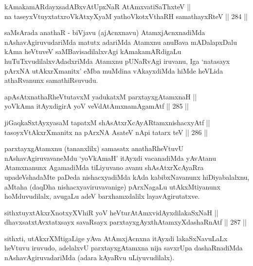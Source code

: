 \begin{shl}
kAmakamARdayxsadABxvAtUpxNaR AtAmx\s vatiSaThxteV ||  \\
na taseyxVtuyxtatxroVkAtxyX\s yaM yathoVkotxV\s thaRH samathayxRteV \hfill || 284 ||  
\end{shl}

\begin{artha}
saMsArada anathaR - biVjavu (ajAcnxnavu) AtamxjAcnxnadiMda
nAshavAgiruvudariMda matutx adariMda Atamxnu anuBava mADalapxDalu kAma
heVtuveV saMBavisadilalxvAgi kAmakamARdigaLu huTuTxvudilalxvAdadxriMda
Atamxnu pUNaRvAgi iruvanu, Iga `natasayx pArxNA utAkxrXmanitx' eMba
muMdina vAkayxdiMda hiMde heVLida athaRvanunx samathiRsuvudu.
\end{artha}

\begin{shl}
apAsAtxnathaRheVtutavxM yadukatxM parxtayxgAtamxnaH || \\
yoV\s kAma itAyxdigirA yoV veVdA\s \s tAmxnamAgamAtf \hfill || 285 ||  
\end{shl}

\begin{shl}
jiGaqkaSxtAyxyasaM tapatxM shAsAtxrXcAyARtamxnishacxyAtf ||  \\
tasoyxVtAkxrXmanitx na pArxNA AsateV nApi tatarx teV \hfill || 286 ||  
\end{shl}

\begin{artha}
parxtayxgAtamxnu (tananxlilx) samasatx anathaRheVtuvU
nAshavAgiruvavaneMdu `yoV\s kAmaH' itAyxdi vacanadiMda yAvAtanu
Atamxnanunx AgamadiMda tiLiyuvano avanu shAsAtxrXcAyaRra
upadeVshadaMte paDeda nishacxyadiMda kAda kabibxNavanunx
hiDiyabalalxnu, aMtaha (daqDha nishacxyaviruvavanige) pArxNagaLu
utAkxMtiyanunx hoMduvudilalx, avugaLu adeV barxhamxdalilx
layavAgirutatxve.
\end{artha}


\begin{shl}
sithxtuyxtAkxrXnotxyXVhiR yoV heVturAtAmxvidAyxdilakaSxNaH || \\
dhavxsatxtAvxtatxsayx savaRsayx parxtayxgAyxthAtamxyXdashaRnAtf \hfill || 287 ||  
\end{shl}

\begin{artha}
sithxti, utAkxrXMtigaLige yAva AtAmxjAcnxna itAyxdi lakaSxNavuLaLx
heVtuvu iruvudo, adelalxvU parxtayxgAtamxna nija savxrUpa
dashaRnadiMda nAshavAgiruvadariMda (adara kAyaRvu uLiyuvudilalx).
\end{artha}


